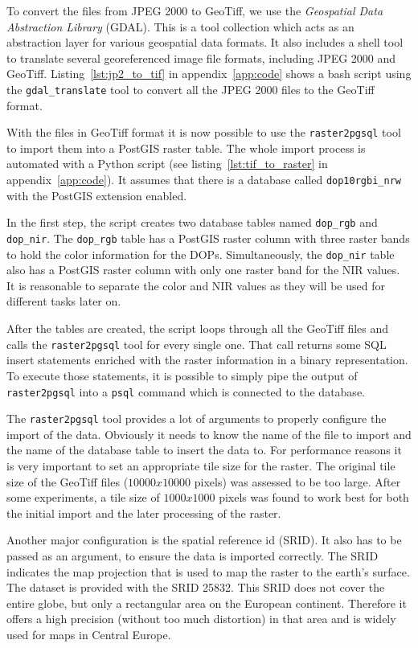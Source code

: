 To convert the files from JPEG 2000 to GeoTiff, we use the \emph{Geospatial Data Abstraction Library} (GDAL). This is a tool collection which acts as an abstraction layer for various geospatial data formats. It also includes a shell tool to translate several georeferenced image file formats, including JPEG 2000 and GeoTiff. Listing~\ref{lst:jp2_to_tif} in appendix~\ref{app:code} shows a bash script using the \texttt{gdal\_translate} tool to convert all the JPEG 2000 files to the GeoTiff format.

With the files in GeoTiff format it is now possible to use the \texttt{raster2pgsql} tool to import them into a PostGIS raster table. The whole import process is automated with a Python script (see listing~\ref{lst:tif_to_raster} in appendix~\ref{app:code}). It assumes that there is a database called \texttt{dop10rgbi\_nrw} with the PostGIS extension enabled.

In the first step, the script creates two database tables named \texttt{dop\_rgb} and \texttt{dop\_nir}. The \texttt{dop\_rgb} table has a PostGIS raster column with three raster bands to hold the color information for the DOPs. Simultaneously, the \texttt{dop\_nir} table also has a PostGIS raster column with only one raster band for the NIR values. It is reasonable to separate the color and NIR values as they will be used for different tasks later on.

After the tables are created, the script loops through all the GeoTiff files and calls the \texttt{raster2pgsql} tool for every single one. That call returns some SQL insert statements enriched with the raster information in a binary representation. To execute those statements, it is possible to simply pipe the output of \texttt{raster2pgsql} into a \texttt{psql} command which is connected to the database.

The \texttt{raster2pgsql} tool provides a lot of arguments to properly configure the import of the data. Obviously it needs to know the name of the file to import and the name of the database table to insert the data to. For performance reasons it is very important to set an appropriate tile size for the raster. The original tile size of the GeoTiff files ($10000x10000$ pixels) was assessed to be too large. After some experiments, a tile size of $1000x1000$ pixels was found to work best for both the initial import and the later processing of the raster.

Another major configuration is the spatial reference id (SRID). It also has to be passed as an argument, to ensure the data is imported correctly. The SRID indicates the map projection that is used to map the raster to the earth's surface. The dataset is provided with the SRID 25832. This SRID does not cover the entire globe, but only a rectangular area on the European continent. Therefore it offers a high precision (without too much distortion) in that area and is widely used for maps in Central Europe.

